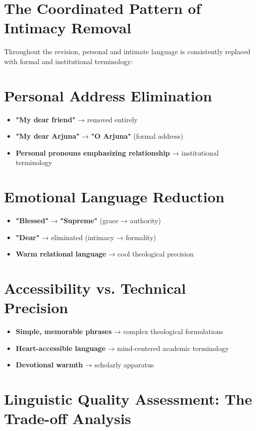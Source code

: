 \documentclass[11pt,twoside]{book}
\begin{document}
\section*{The Coordinated Pattern of Intimacy Removal}
\label{sec:org0eb0188}

Throughout the revision, personal and intimate language is consistently replaced with formal and institutional terminology:
\section*{Personal Address Elimination}
\label{sec:orgafb5e34}
\begin{itemize}
\item \textbf{\textbf{"My dear friend"}} → removed entirely
\item \textbf{\textbf{"My dear Arjuna"}} → \textbf{\textbf{"O Arjuna"}} (formal address)
\item \textbf{\textbf{Personal pronouns emphasizing relationship}} → institutional terminology
\end{itemize}
\section*{Emotional Language Reduction}
\label{sec:org2023b28}
\begin{itemize}
\item \textbf{\textbf{"Blessed"}} → \textbf{\textbf{"Supreme"}} (grace → authority)
\item \textbf{\textbf{"Dear"}} → eliminated (intimacy → formality)
\item \textbf{\textbf{Warm relational language}} → cool theological precision
\end{itemize}
\section*{Accessibility vs. Technical Precision}
\label{sec:orgcddaab3}
\begin{itemize}
\item \textbf{\textbf{Simple, memorable phrases}} → complex theological formulations
\item \textbf{\textbf{Heart-accessible language}} → mind-centered academic terminology
\item \textbf{\textbf{Devotional warmth}} → scholarly apparatus
\end{itemize}
\section*{Linguistic Quality Assessment: The Trade-off Analysis}
\label{sec:orgeacb0ee}
\end{document}
